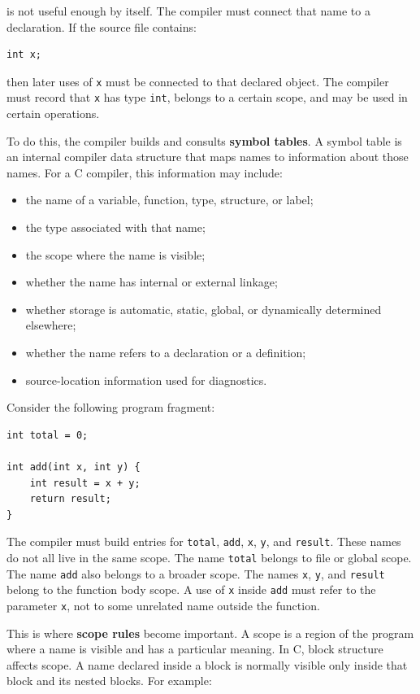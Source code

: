 is not useful enough by itself. The compiler must connect that name to a declaration. If the source file contains:

\begin{verbatim}
int x;
\end{verbatim}

then later uses of \texttt{x} must be connected to that declared object. The compiler must record that \texttt{x} has type \texttt{int}, belongs to a certain scope, and may be used in certain operations.

To do this, the compiler builds and consults \textbf{symbol tables}. A symbol table is an internal compiler data structure that maps names to information about those names. For a C compiler, this information may include:

\begin{itemize}
    \item the name of a variable, function, type, structure, or label;
    \item the type associated with that name;
    \item the scope where the name is visible;
    \item whether the name has internal or external linkage;
    \item whether storage is automatic, static, global, or dynamically determined elsewhere;
    \item whether the name refers to a declaration or a definition;
    \item source-location information used for diagnostics.
\end{itemize}

Consider the following program fragment:

\begin{verbatim}
int total = 0;

int add(int x, int y) {
    int result = x + y;
    return result;
}
\end{verbatim}

The compiler must build entries for \texttt{total}, \texttt{add}, \texttt{x}, \texttt{y}, and \texttt{result}. These names do not all live in the same scope. The name \texttt{total} belongs to file or global scope. The name \texttt{add} also belongs to a broader scope. The names \texttt{x}, \texttt{y}, and \texttt{result} belong to the function body scope. A use of \texttt{x} inside \texttt{add} must refer to the parameter \texttt{x}, not to some unrelated name outside the function.

This is where \textbf{scope rules} become important. A scope is a region of the program where a name is visible and has a particular meaning. In C, block structure affects scope. A name declared inside a block is normally visible only inside that block and its nested blocks. For example:

